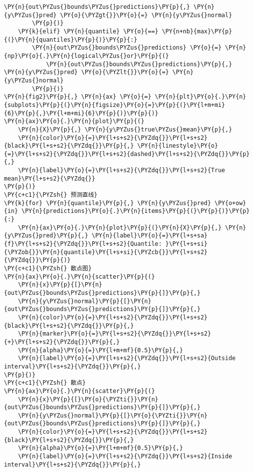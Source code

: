 \begin{Verbatim}[commandchars=\\\{\}]
            \PY{n}{out\PYZus{}bounds\PYZus{}predictions}\PY{p}{,} \PY{n}{y\PYZus{}pred} \PY{o}{\PYZgt{}}\PY{o}{=} \PY{n}{y\PYZus{}normal}
        \PY{p}{)}
    \PY{k}{elif} \PY{n}{quantile} \PY{o}{==} \PY{n+nb}{max}\PY{p}{(}\PY{n}{quantiles}\PY{p}{)}\PY{p}{:}
        \PY{n}{out\PYZus{}bounds\PYZus{}predictions} \PY{o}{=} \PY{n}{np}\PY{o}{.}\PY{n}{logical\PYZus{}or}\PY{p}{(}
            \PY{n}{out\PYZus{}bounds\PYZus{}predictions}\PY{p}{,} \PY{n}{y\PYZus{}pred} \PY{o}{\PYZlt{}}\PY{o}{=} \PY{n}{y\PYZus{}normal}
        \PY{p}{)}
\PY{n}{fig2}\PY{p}{,} \PY{n}{ax} \PY{o}{=} \PY{n}{plt}\PY{o}{.}\PY{n}{subplots}\PY{p}{(}\PY{n}{figsize}\PY{o}{=}\PY{p}{(}\PY{l+m+mi}{6}\PY{p}{,}\PY{l+m+mi}{6}\PY{p}{)}\PY{p}{)}
\PY{n}{ax}\PY{o}{.}\PY{n}{plot}\PY{p}{(}
    \PY{n}{X}\PY{p}{,} \PY{n}{y\PYZus{}true\PYZus{}mean}\PY{p}{,} 
    \PY{n}{color}\PY{o}{=}\PY{l+s+s2}{\PYZdq{}}\PY{l+s+s2}{black}\PY{l+s+s2}{\PYZdq{}}\PY{p}{,} \PY{n}{linestyle}\PY{o}{=}\PY{l+s+s2}{\PYZdq{}}\PY{l+s+s2}{dashed}\PY{l+s+s2}{\PYZdq{}}\PY{p}{,} 
    \PY{n}{label}\PY{o}{=}\PY{l+s+s2}{\PYZdq{}}\PY{l+s+s2}{True mean}\PY{l+s+s2}{\PYZdq{}}
\PY{p}{)}
\PY{c+c1}{\PYZsh{} 预测直线}
\PY{k}{for} \PY{n}{quantile}\PY{p}{,} \PY{n}{y\PYZus{}pred} \PY{o+ow}{in} \PY{n}{predictions}\PY{o}{.}\PY{n}{items}\PY{p}{(}\PY{p}{)}\PY{p}{:}
    \PY{n}{ax}\PY{o}{.}\PY{n}{plot}\PY{p}{(}\PY{n}{X}\PY{p}{,} \PY{n}{y\PYZus{}pred}\PY{p}{,} \PY{n}{label}\PY{o}{=}\PY{l+s+sa}{f}\PY{l+s+s2}{\PYZdq{}}\PY{l+s+s2}{Quantile: }\PY{l+s+si}{\PYZob{}}\PY{n}{quantile}\PY{l+s+si}{\PYZcb{}}\PY{l+s+s2}{\PYZdq{}}\PY{p}{)}
\PY{c+c1}{\PYZsh{} 散点图}
\PY{n}{ax}\PY{o}{.}\PY{n}{scatter}\PY{p}{(}
    \PY{n}{x}\PY{p}{[}\PY{n}{out\PYZus{}bounds\PYZus{}predictions}\PY{p}{]}\PY{p}{,}
    \PY{n}{y\PYZus{}normal}\PY{p}{[}\PY{n}{out\PYZus{}bounds\PYZus{}predictions}\PY{p}{]}\PY{p}{,}
    \PY{n}{color}\PY{o}{=}\PY{l+s+s2}{\PYZdq{}}\PY{l+s+s2}{black}\PY{l+s+s2}{\PYZdq{}}\PY{p}{,}
    \PY{n}{marker}\PY{o}{=}\PY{l+s+s2}{\PYZdq{}}\PY{l+s+s2}{+}\PY{l+s+s2}{\PYZdq{}}\PY{p}{,}
    \PY{n}{alpha}\PY{o}{=}\PY{l+m+mf}{0.5}\PY{p}{,}
    \PY{n}{label}\PY{o}{=}\PY{l+s+s2}{\PYZdq{}}\PY{l+s+s2}{Outside interval}\PY{l+s+s2}{\PYZdq{}}\PY{p}{,}
\PY{p}{)}
\PY{c+c1}{\PYZsh{} 散点}
\PY{n}{ax}\PY{o}{.}\PY{n}{scatter}\PY{p}{(}
    \PY{n}{x}\PY{p}{[}\PY{o}{\PYZti{}}\PY{n}{out\PYZus{}bounds\PYZus{}predictions}\PY{p}{]}\PY{p}{,}
    \PY{n}{y\PYZus{}normal}\PY{p}{[}\PY{o}{\PYZti{}}\PY{n}{out\PYZus{}bounds\PYZus{}predictions}\PY{p}{]}\PY{p}{,}
    \PY{n}{color}\PY{o}{=}\PY{l+s+s2}{\PYZdq{}}\PY{l+s+s2}{black}\PY{l+s+s2}{\PYZdq{}}\PY{p}{,}
    \PY{n}{alpha}\PY{o}{=}\PY{l+m+mf}{0.5}\PY{p}{,}
    \PY{n}{label}\PY{o}{=}\PY{l+s+s2}{\PYZdq{}}\PY{l+s+s2}{Inside interval}\PY{l+s+s2}{\PYZdq{}}\PY{p}{,}

\end{Verbatim}
